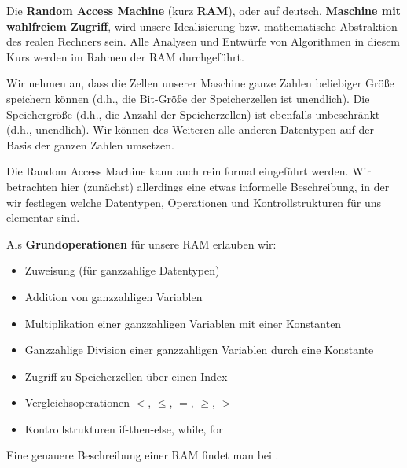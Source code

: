 \begin{bem} 
Die \textbf{Random Access Machine} (kurz \textbf{RAM}), oder auf deutsch, \textbf{Maschine mit wahlfreiem Zugriff}, wird unsere Idealisierung bzw. mathematische Abstraktion des realen Rechners sein. Alle Analysen und Entwürfe von Algorithmen in diesem Kurs werden im Rahmen der RAM durchgeführt. 

Wir nehmen an, dass die Zellen unserer Maschine ganze Zahlen beliebiger Größe speichern können (d.h., die Bit-Größe der Speicherzellen ist unendlich). Die Speichergröße (d.h., die Anzahl der Speicherzellen) ist ebenfalls unbeschränkt (d.h., unendlich). Wir können des Weiteren alle anderen Datentypen auf der Basis der ganzen Zahlen umsetzen. 

Die Random Access Machine kann auch rein formal eingeführt werden. Wir betrachten hier (zunächst) allerdings eine etwas informelle Beschreibung, in der wir festlegen welche Datentypen, Operationen und Kontrollstrukturen für uns elementar sind. 

Als \textbf{Grundoperationen} für unsere RAM erlauben wir:
%
\begin{itemize}
	\item Zuweisung (für ganzzahlige Datentypen)
	\item Addition von ganzzahligen Variablen
	\item Multiplikation einer ganzzahligen Variablen mit einer Konstanten
	\item Ganzzahlige Division einer ganzzahligen Variablen durch eine Konstante
	\item Zugriff zu Speicherzellen über einen Index
	\item Vergleichsoperationen $<$, $\le$, $=$, $\ge$, $>$ 
	\item Kontrollstrukturen if-then-else, while, for 
\end{itemize}

Eine genauere Beschreibung einer RAM findet man bei \cite[Sect.~1.3]{Lov20}.
\end{bem} 


